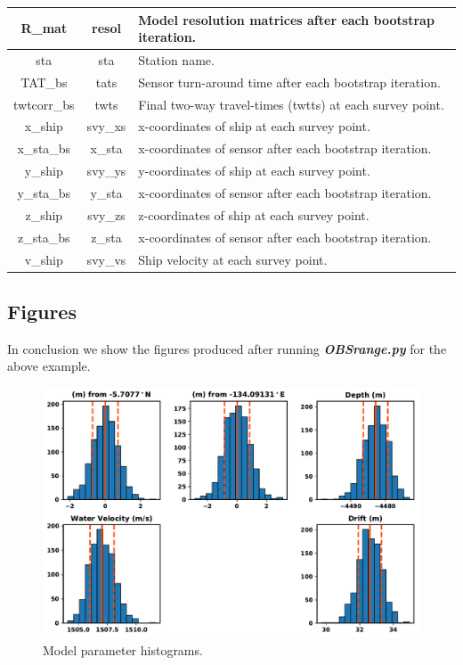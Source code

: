 \documentclass[titlepage, 12pt]{article}
\begin{document}
\begin{table}[!htb]
\begin{tabularx}{\linewidth}{|c|c|X|}
    R\_mat          & resol      & Model resolution matrices after each bootstrap iteration. \\ \hline
    sta             & sta        & Station name. \\ \hline
    TAT\_bs         & tats       & Sensor turn-around time after each bootstrap iteration. \\ \hline
    twtcorr\_bs     & twts       & Final two-way travel-times (twtts) at each survey point. \\ \hline
    x\_ship         & svy\_xs    & x-coordinates of ship at each survey point. \\ \hline
    x\_sta\_bs      & x\_sta     & x-coordinates of sensor after each bootstrap iteration. \\ \hline
    y\_ship         & svy\_ys    & y-coordinates of ship at each survey point. \\ \hline
    y\_sta\_bs      & y\_sta     & x-coordinates of sensor after each bootstrap iteration. \\ \hline
    z\_ship         & svy\_zs    & z-coordinates of ship at each survey point. \\ \hline
    z\_sta\_bs      & z\_sta     & x-coordinates of sensor after each bootstrap iteration. \\ \hline
    v\_ship         & svy\_vs    & Ship velocity at each survey point. \\ \hline
    \end{tabularx}
   \end{table}
  
  \newpage

  \subsection{Figures}
  In conclusion we show the figures produced after running \textit{\textbf{OBSrange.py}} for the above example.

  \begin{figure}[!htb]
   \centering
   \includegraphics[width=0.8\linewidth]{histograms.pdf}
   \caption{Model parameter histograms.}
  \end{figure}
\end{document}
